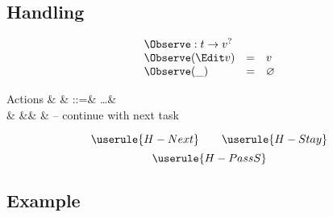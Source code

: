 \subsection{Handling}

\begin{equation*}
  \begin{array}{lcl}
    \multicolumn{3}{l}{\Observe : t \to v^?} \\
    \Observe(\Edit v) &=& v \\
    \Observe(\_)      &=& \nothing
  \end{array}
\end{equation*}

\begin{grammar}
  Actions
    & \alpha & ::=& \ldots & \\
    &        &\mid& \Next  & – continue with next task \\
\end{grammar}

\begin{equation*}
  \userule{H-Next} \qquad \userule{H-Stay}
\end{equation*}
\begin{equation*}
  \userule{H-PassS}
\end{equation*}

\subsection{Example}
